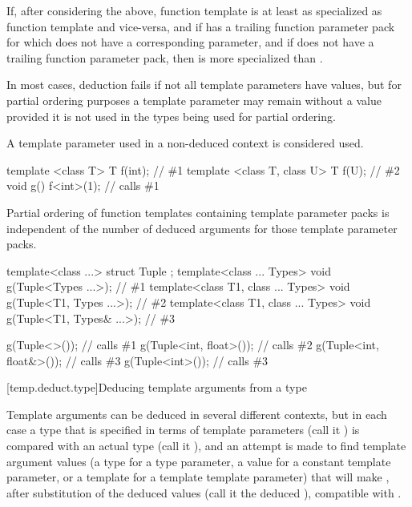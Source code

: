 \pnum
If, after considering the above, function template 
is at least as specialized as function template  and vice-versa, and
if  has a trailing function parameter pack
for which  does not have a corresponding parameter, and
if  does not have a trailing function parameter pack,
then  is more specialized than .

\pnum
In most cases,
deduction fails if not all template parameters have values,
but for partial ordering purposes a template
parameter may remain without a value provided it is not used in the
types being used for partial ordering.
\begin{note}
A template parameter used in a non-deduced context is considered used.
\end{note}
\begin{example}
\begin{codeblock}
template <class T> T f(int);            // \#1
template <class T, class U> T f(U);     // \#2
void g() {
  f<int>(1);                            // calls \#1
}
\end{codeblock}
\end{example}

\pnum
\begin{note}
Partial ordering of function templates containing
template parameter packs is independent of the number of deduced arguments
for those template parameter packs.
\end{note}
\begin{example}
\begin{codeblock}
template<class ...> struct Tuple { };
template<class ... Types> void g(Tuple<Types ...>);                 // \#1
template<class T1, class ... Types> void g(Tuple<T1, Types ...>);   // \#2
template<class T1, class ... Types> void g(Tuple<T1, Types& ...>);  // \#3

g(Tuple<>());                   // calls \#1
g(Tuple<int, float>());         // calls \#2
g(Tuple<int, float&>());        // calls \#3
g(Tuple<int>());                // calls \#3
\end{codeblock}
\end{example}

[temp.deduct.type]{Deducing template arguments from a type}

\pnum
Template arguments can be deduced in several different contexts, but
in each case a type that is specified in terms of template parameters
(call it
)
is compared with an actual type (call it
),
and an attempt is made to find template argument values (a type for a type
parameter, a value for a constant template parameter, or a template for a
template template parameter) that will make
,
after substitution of the deduced values (call it the deduced
),
compatible with
.

